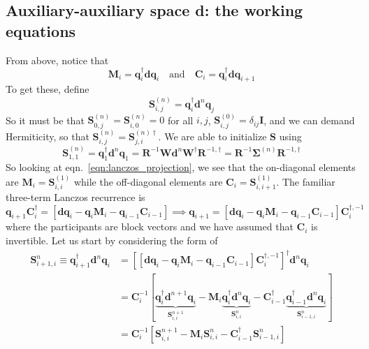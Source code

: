\subsection{Auxiliary-auxiliary space d: the working equations}
From above, notice that
\begin{equation}
    \bm{M}_i = \bm{q}_i^{\dag}\bm{d}\bm{q}_i \quad \text{and} \quad \bm{C}_i = \bm{q}_i^{\dag}\bm{d}\bm{q}_{i+1}
\end{equation}
To get these, define
\begin{equation}
    \bm{S}_{i,j}^{(n)} = \bm{q}_i^{\dag}\bm{d}^n\bm{q}_j
\end{equation}
So it must be that $\bm{S}_{0,j}^{(n)} = \bm{S}_{i,0}^{(n)} = 0$ for all $i,j$, $\bm{S}_{i,j}^{(0)} = \delta_{ij}\bm{I}$, and we can demand Hermiticity, so that $\bm{S}_{i,j}^{(n)} = \bm{S}_{j,i}^{(n)\dag}$. We are able to initialize $\bm{S}$ using 
\begin{equation}
    \bm{S}_{1,1}^{(n)} = \bm{q}_1^{\dag}\bm{d}^n\bm{q}_1 = \bm{R}^{-1}\bm{W}\bm{d}^n\bm{W}^{\dagger}\bm{R}^{-1, \dag} = \bm{R}^{-1}\bm{\Sigma}^{(n)}\bm{R}^{-1, \dag}
\end{equation}
So looking at eqn.~\ref{eqn:lanczos_projection}, we see that the on-diagonal elements are $\bm{M}_i=\bm{S}_{i,i}^{(1)}$ while the off-diagonal elements are $\bm{C}_i=\bm{S}_{i,i+1}^{(1)}$. The familiar three-term Lanczos recurrence is
\begin{equation}
    \mathbf{q}_{i+1} \mathbf{C}_i^{\dagger}=\left[\mathbf{d} \mathbf{q}_i-\mathbf{q}_i \mathbf{M}_i-\mathbf{q}_{i-1} \mathbf{C}_{i-1}\right] \implies \mathbf{q}_{i+1} = \left[\mathbf{d} \mathbf{q}_i-\mathbf{q}_i \mathbf{M}_i-\mathbf{q}_{i-1} \mathbf{C}_{i-1}\right] \bm{C}_i^{\dag, -1}
\label{eqn:lanczos_recurrence}
    \end{equation}
where the participants are block vectors and we have assumed that $\bm{C}_i$ is invertible. Let us start by considering the form of
\begin{align}
    \bm{S}_{i+1,i}^{n}\equiv\bm{q}_{i+1}^{\dag}\bm{d}^n\bm{q}_{i} &= \left[\left[\mathbf{d} \mathbf{q}_i-\mathbf{q}_i \mathbf{M}_i-\mathbf{q}_{i-1} \mathbf{C}_{i-1}\right]\bm{C}_i^{\dag, -1}\right]^{\dag}\bm{d}^n\bm{q}_{i} \\
    &= \bm{C}_i^{-1}\left[\underbrace{\bm{q}_i^{\dag}\bm{d}^{n+1}\bm{q}_{i}}_{\bm{S}_{i,i}^{n+1}} - \bm{M}_i\underbrace{\bm{q}_i^{\dag}\bm{d}^n\bm{q}_{i}}_{\bm{S}_{i,i}^n} - \bm{C}_{i-1}^{\dag}\underbrace{\bm{q}_{i-1}^{\dag}\bm{d}^{n}\bm{q}_{i}}_{\bm{S}_{i-1,i}^n}\right]\\
    &= \boxed{\bm{C}_i^{-1}\left[\bm{S}_{i,i}^{n+1} - \bm{M}_i\bm{S}_{i,i}^n - \bm{C}_{i-1}^{\dag}\bm{S}_{i-1,i}^n\right]}
\end{align}
